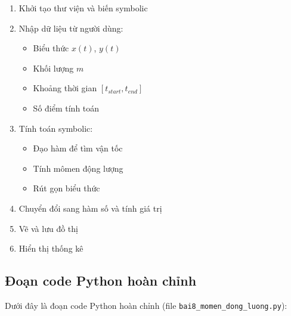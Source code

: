 \documentclass{report}
\begin{document}
\begin{enumerate}
    \item Khởi tạo thư viện và biến symbolic
    \item Nhập dữ liệu từ người dùng:
    \begin{itemize}
        \item Biểu thức $x(t)$, $y(t)$
        \item Khối lượng $m$
        \item Khoảng thời gian $[t_{start}, t_{end}]$
        \item Số điểm tính toán
    \end{itemize}
    \item Tính toán symbolic:
    \begin{itemize}
        \item Đạo hàm để tìm vận tốc
        \item Tính mômen động lượng
        \item Rút gọn biểu thức
    \end{itemize}
    \item Chuyển đổi sang hàm số và tính giá trị
    \item Vẽ và lưu đồ thị
    \item Hiển thị thống kê
\end{enumerate}

\subsection{Đoạn code Python hoàn chỉnh}
Dưới đây là đoạn code Python hoàn chỉnh (file \texttt{bai8\_momen\_dong\_luong.py}):
\end{document}
